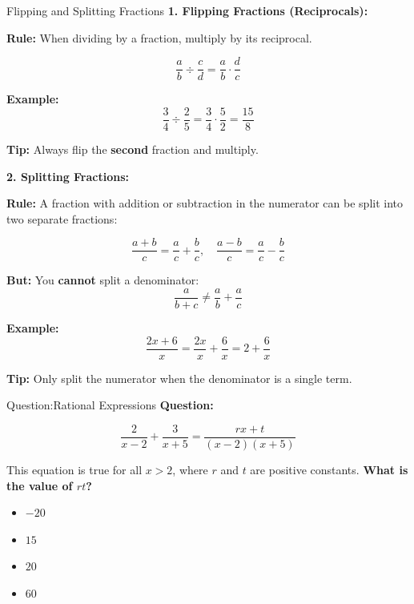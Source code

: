 \documentclass{beamer}
\begin{document}
\begin{frame}{Flipping and Splitting Fractions}
\small
\textbf{1. Flipping Fractions (Reciprocals):}

\textbf{Rule:} When dividing by a fraction, multiply by its reciprocal.

\[
\frac{a}{b} \div \frac{c}{d} = \frac{a}{b} \cdot \frac{d}{c}
\]

\vspace{0.2cm}
\textbf{Example:}
\[
\frac{3}{4} \div \frac{2}{5} = \frac{3}{4} \cdot \frac{5}{2} = \frac{15}{8}
\]

\textbf{Tip:} Always flip the \textbf{second} fraction and multiply.

\vspace{0.4cm}
\textbf{2. Splitting Fractions:}

\textbf{Rule:} A fraction with addition or subtraction in the numerator can be split into two separate fractions:

\[
\frac{a + b}{c} = \frac{a}{c} + \frac{b}{c}, \quad \frac{a - b}{c} = \frac{a}{c} - \frac{b}{c}
\]

\textbf{But:} You \textbf{cannot} split a denominator:
\[
\frac{a}{b + c} \ne \frac{a}{b} + \frac{a}{c}
\]

\vspace{0.2cm}
\textbf{Example:}
\[
\frac{2x + 6}{x} = \frac{2x}{x} + \frac{6}{x} = 2 + \frac{6}{x}
\]

\textbf{Tip:} Only split the numerator when the denominator is a single term.
\end{frame}


\begin{frame}{Question:Rational Expressions}
\small
\textbf{Question:}

\[
\frac{2}{x - 2} + \frac{3}{x + 5} = \frac{rx + t}{(x - 2)(x + 5)}
\]

This equation is true for all $x > 2$, where $r$ and $t$ are positive constants.  
\textbf{What is the value of $rt$?}

\begin{itemize}
    \item[A.] $-20$
    \item[B.] $15$
    \item[C.] $20$
    \item[D.] $60$
\end{itemize}
\end{frame}
\end{document}
